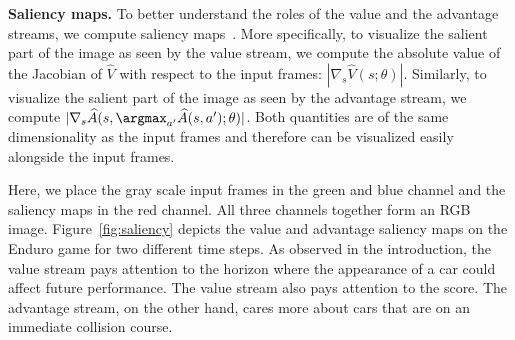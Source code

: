 




{\bf Saliency maps.} To better understand the roles of the value
and the advantage streams, we compute saliency maps~\cite{Simonyan:2013}.
More specifically, to visualize the salient part of the image as seen by the value stream,
we compute the absolute value of the Jacobian of $\widehat{V}$ with respect to the input frames:
$|\nabla_{s} \widehat{V}(s ;\theta)|.$
Similarly, to visualize the salient part of the image as seen by the advantage stream,
we compute $|\nabla_{s} \widehat{A}(s, \argmax_{a'} \widehat{A}(s, a');\theta)|$.
Both quantities are of the same dimensionality as the input frames and therefore
can be visualized easily alongside the input frames.

Here, we place the gray scale input frames in the green and blue channel and
the saliency maps in the red channel.
All three channels together form an RGB image.
Figure~\ref{fig:saliency} depicts the
value and advantage saliency maps on the Enduro game for two different time steps. 
As observed in the introduction, the value stream pays attention 
to the horizon where the appearance of a car could affect future performance.
The value stream also pays attention to the score.
The advantage stream, on the other hand, cares more about cars 
that are on an immediate collision course.




